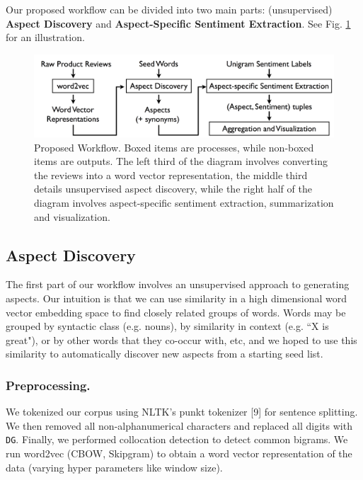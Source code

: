 \documentclass{article} %
\begin{document}
Our proposed workflow can be divided into two main parts: (unsupervised) {\bf Aspect Discovery} and {\bf Aspect-Specific Sentiment Extraction}. See Fig. \ref{workflow} for an illustration.


\begin{figure}[ht]
\begin{center}
\includegraphics[width=.85\columnwidth]{workflow.png}
\end{center}
\caption{Proposed Workflow. Boxed items are processes, while non-boxed items are outputs. The left third of the diagram involves converting the reviews into a word vector representation, the middle third details unsupervised aspect discovery, while the right half of the diagram involves aspect-specific sentiment extraction, summarization and visualization.}%
\label{workflow}
\end{figure}


\subsection{Aspect Discovery}

The first part of our workflow involves an unsupervised approach to generating aspects. Our intuition is that we can use similarity in a high dimensional word vector embedding space to find closely related groups of words. Words may be grouped by syntactic class (e.g. nouns), by similarity in context (e.g. ``X is great"), or by other words that they co-occur with, etc, and we hoped to use this similarity to automatically discover new aspects from a starting seed list.

\subsubsection{Preprocessing.} We tokenized our corpus using NLTK's punkt tokenizer [9] for sentence splitting. We then removed all non-alphanumerical characters and replaced all digits with \texttt{DG}. Finally, we performed collocation detection to detect common bigrams. We run word2vec (CBOW, Skipgram) to obtain a word vector representation of the data (varying hyper parameters like window size). 
\end{document}
